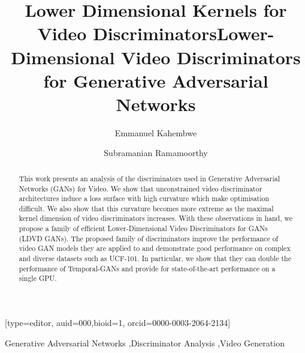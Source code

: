 \documentclass[a4paper,fleqn]{cas-sc}
\begin{document}
\let\WriteBookmarks\relax
\def\floatpagepagefraction{1}
\def\textpagefraction{.001}


\title [mode = title]{Lower Dimensional Kernels for Video Discriminators}
\title [mode=alt]{Lower-Dimensional Video Discriminators for Generative Adversarial Networks}



\author[1,2,3]{Emmanuel Kahembwe}[type=editor,
                        auid=000,bioid=1, orcid=0000-0003-2064-2134]
\cormark[1]

\author[1,2,4]{Subramanian Ramamoorthy}
\address[1]{Robust Autonomy and Decisions Group, The School of Informatics, The University of Edinburgh, 10 Crichton St, Edinburgh EH8 9AB}
\address[2]{The Edinburgh Centre of Robotics, The University of Edinburgh's Bayes Centre, 47 Potterrow,
Edinburgh EH8 9BT}
\address[3]{The School of Engineering and Physical Sciences, The Robotarium, Heriot-Watt University,  Edinburgh, EH14 4AS}
\address[4]{FiveAI, 5th Floor, Greenside, 12 Blenheim Place, Edinburgh, EH7 5JH}




\begin{abstract}
This work presents an analysis of the discriminators used in Generative Adversarial Networks (GANs) for Video. We show that unconstrained video discriminator architectures induce a loss surface with high curvature which make optimisation difficult. We also show that this curvature becomes more extreme as the maximal kernel dimension of video discriminators increases. With these observations in hand, we propose a family of efficient Lower-Dimensional Video Discriminators for GANs (LDVD GANs). The proposed family of discriminators improve the performance of video GAN models they are applied to and demonstrate good performance on complex and diverse datasets such as UCF-101. In particular, we show that they can double the performance of Temporal-GANs and provide for state-of-the-art performance on a single GPU.
\end{abstract}

\begin{keywords}
Generative Adversarial Networks \sep Discriminator Analysis \sep Video Generation 
\end{keywords}
\end{document}
